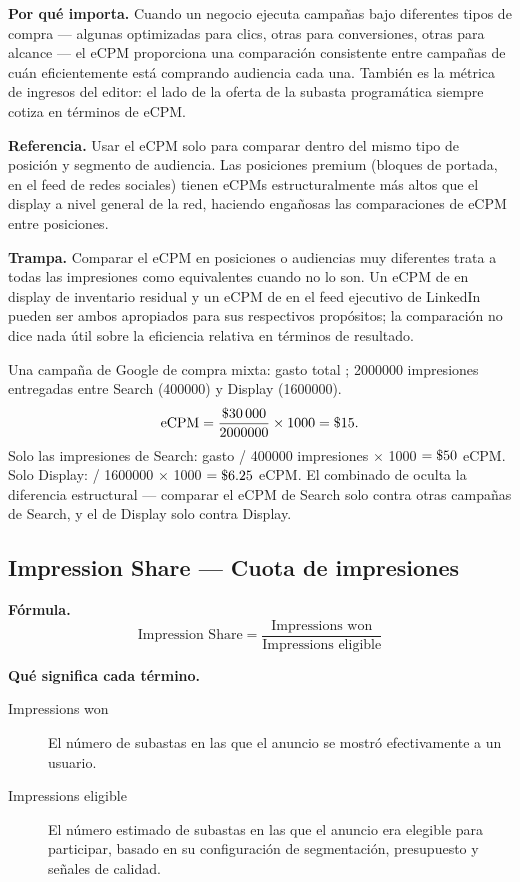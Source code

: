\textbf{Por qué importa.} Cuando un negocio ejecuta campañas bajo diferentes tipos de compra
--- algunas optimizadas para clics, otras para conversiones, otras para alcance --- el eCPM
proporciona una comparación consistente entre campañas de cuán eficientemente está comprando
audiencia cada una. También es la métrica de ingresos del editor: el lado de la oferta de la
subasta programática siempre cotiza en términos de eCPM.

\textbf{Referencia.} Usar el eCPM solo para comparar dentro del mismo tipo de posición y
segmento de audiencia. Las posiciones premium (bloques de portada, en el feed de redes
sociales) tienen eCPMs estructuralmente más altos que el display a nivel general de la red,
haciendo engañosas las comparaciones de eCPM entre posiciones.

\textbf{Trampa.} Comparar el eCPM en posiciones o audiencias muy diferentes trata a todas
las impresiones como equivalentes cuando no lo son. Un eCPM de  en display de
inventario residual y un eCPM de  en el feed ejecutivo de LinkedIn pueden ser
ambos apropiados para sus respectivos propósitos; la comparación no dice nada útil sobre la
eficiencia relativa en términos de resultado.

\begin{example}
Una campaña de Google de compra mixta: gasto total ; \num{2000000} impresiones
entregadas entre Search (\num{400000}) y Display (\num{1600000}).
\[
  \mathrm{eCPM} = \frac{\$\num{30000}}{2000000} \times 1000 = \$\num{15}.
\]
Solo las impresiones de Search: gasto  / \num{400000} impresiones $\times$ 1000
$= \$\num{50}$ eCPM. Solo Display:  / \num{1600000} $\times$ 1000
$= \$\num{6.25}$ eCPM. El combinado de  oculta la diferencia estructural ---
comparar el eCPM de Search solo contra otras campañas de Search, y el de Display solo
contra Display.
\end{example}


\subsection{Impression Share --- Cuota de impresiones}

\textbf{Fórmula.}
\[
  \text{Impression Share} = \frac{\text{Impressions won}}{\text{Impressions eligible}}
\]

\textbf{Qué significa cada término.}
\begin{description}
  \item[Impressions won] El número de subastas en las que el anuncio se mostró efectivamente
    a un usuario.
  \item[Impressions eligible] El número estimado de subastas en las que el anuncio era
    elegible para participar, basado en su configuración de segmentación, presupuesto y
    señales de calidad.
\end{description}

